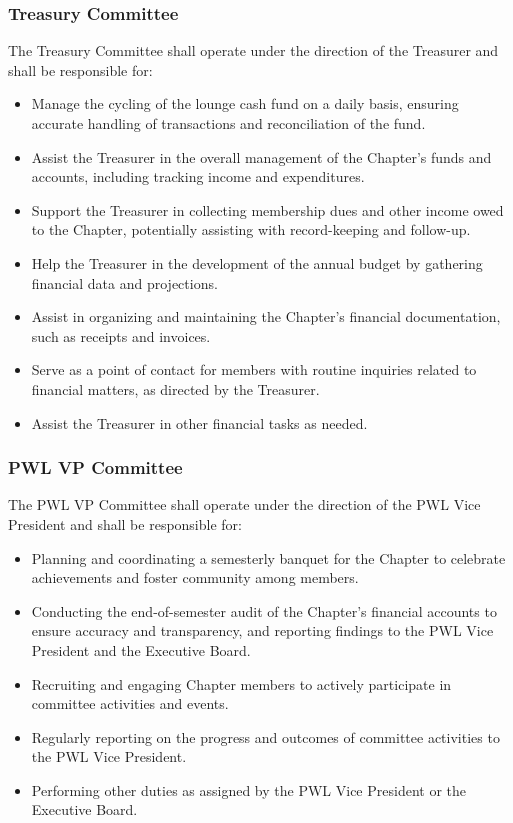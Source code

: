 \documentclass[10pt, oneside]{article}
\begin{document}
\subsubsection{Treasury Committee}
The Treasury Committee shall operate under the direction of the Treasurer and shall be responsible for:
\begin{itemize}
    \item Manage the cycling of the lounge cash fund on a daily basis, ensuring accurate handling of transactions and reconciliation of the fund.
    \item Assist the Treasurer in the overall management of the Chapter's funds and accounts, including tracking income and expenditures.
    \item Support the Treasurer in collecting membership dues and other income owed to the Chapter, potentially assisting with record-keeping and follow-up.
    \item Help the Treasurer in the development of the annual budget by gathering financial data and projections.
    \item Assist in organizing and maintaining the Chapter's financial documentation, such as receipts and invoices.
    \item Serve as a point of contact for members with routine inquiries related to financial matters, as directed by the Treasurer.
    \item Assist the Treasurer in other financial tasks as needed.
\end{itemize}

\subsubsection{PWL VP Committee}
The PWL VP Committee shall operate under the direction of the PWL Vice President and shall be responsible for:
\begin{itemize}
      \item Planning and coordinating a semesterly banquet for the Chapter to celebrate achievements and foster community among members.
    \item Conducting the end-of-semester audit of the Chapter's financial accounts to ensure accuracy and transparency, and reporting findings to the PWL Vice President and the Executive Board.
    \item Recruiting and engaging Chapter members to actively participate in committee activities and events.
    \item Regularly reporting on the progress and outcomes of committee activities to the PWL Vice President.
    \item Performing other duties as assigned by the PWL Vice President or the Executive Board.
\end{itemize}
\end{document}
